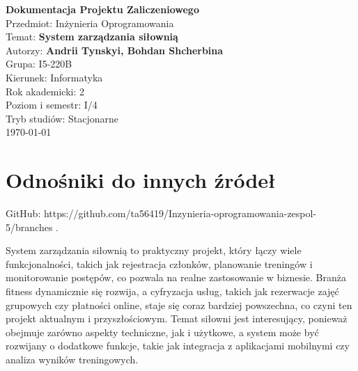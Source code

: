 \documentclass[a4paper,12pt]{article}
\begin{document}
\begin{titlepage}
    \centering
    \vspace*{5cm}
    {\Huge \textbf{Dokumentacja Projektu Zaliczeniowego}}\\[1.5cm]
    {\LARGE Przedmiot: Inżynieria Oprogramowania}\\[1cm]
    {\Large Temat: \textbf{System zarządzania siłownią}}\\[1cm]
    {\Large Autorzy: \textbf{Andrii Tynskyi, Bohdan Shcherbina}}\\[1cm]
    {\Large Grupa: I5-220B}\\[1cm]
    {\Large Kierunek: Informatyka}\\[1cm]
    {\Large Rok akademicki: 2}\\[1cm]
    {\Large Poziom i semestr: I/4}\\[1cm]
    {\Large Tryb studiów: Stacjonarne}\\[1cm]
    \vfill
    {\large \today}
\end{titlepage}



\renewcommand{\contentsname}{Spis treści}
\tableofcontents
\newpage


\section{Odnośniki do innych źródeł}
GitHub: https://github.com/ta56419/Inzynieria-oprogramowania-zespol-5/branches .

System zarządzania siłownią to praktyczny projekt, który łączy wiele funkcjonalności, takich jak rejestracja członków, planowanie treningów i monitorowanie postępów, co pozwala na realne zastosowanie w biznesie. Branża fitness dynamicznie się rozwija, a cyfryzacja usług, takich jak rezerwacje zajęć grupowych czy płatności online, staje się coraz bardziej powszechna, co czyni ten projekt aktualnym i przyszłościowym. Temat siłowni jest interesujący, ponieważ obejmuje zarówno aspekty techniczne, jak i użytkowe, a system może być rozwijany o dodatkowe funkcje, takie jak integracja z aplikacjami mobilnymi czy analiza wyników treningowych.
\end{document}
